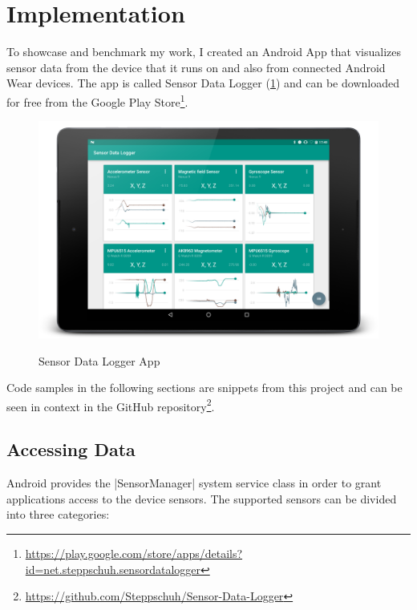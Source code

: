 \section{Implementation}
\label{sec:implementation}

To showcase and benchmark my work, I created an Android App that visualizes sensor data from the device that it runs on and also from connected Android Wear devices.
The app is called Sensor Data Logger (\ref{fig:sensorDataLoggerApp}) and can be downloaded for free from the Google Play Store\footnote{\href{https://play.google.com/store/apps/details?id=net.steppschuh.sensordatalogger}{https://play.google.com/store/apps/details?id=net.steppschuh.sensordatalogger}}.

\begin{figure}[H]
	\href{https://github.com/Steppschuh/Sensor-Data-Logger}{
		\includegraphics[width=\linewidth]{images/app/charts_landscape_framed.png}
	}
	\caption[Caption for Sensor Data Logger App]{Sensor Data Logger App}
	\label{fig:sensorDataLoggerApp}
\end{figure}

Code samples in the following sections are snippets from this project and can be seen in context in the GitHub repository\footnote{\href{https://github.com/Steppschuh/Sensor-Data-Logger}{https://github.com/Steppschuh/Sensor-Data-Logger}}.

\clearpage

\subsection{Accessing Data}

Android provides the |SensorManager|\cite{androiddocs:sensormanager} system service class in order to grant applications access to the device sensors.
The supported sensors can be divided into three categories:

